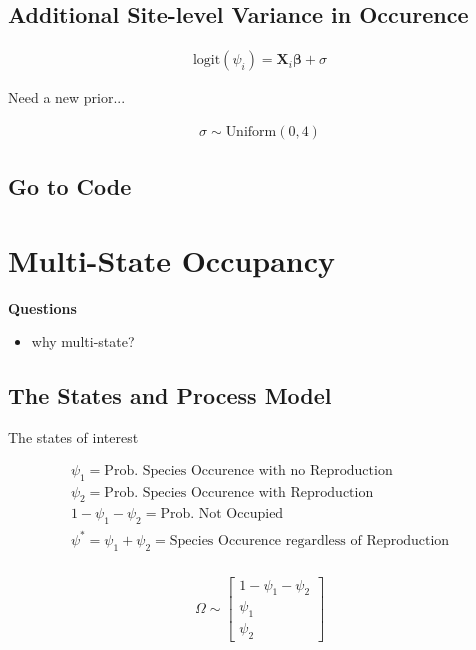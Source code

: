 \documentclass[12pt]{article}
\begin{document}
\subsection{Additional Site-level Variance in Occurence}

\begin{align*}
\text{logit}(\psi_{i}) = \textbf{X}_{i}\boldsymbol{\beta}+ \sigma
\end{align*}

Need a new prior...

\begin{align*}
\sigma \sim \text{Uniform}(0, 4)
\end{align*}


\subsection{Go to Code}

\section{Multi-State Occupancy}

\textbf{Questions}
\begin{itemize}
	\item why multi-state?
\end{itemize}


\subsection{The States and Process Model}

The states of interest

\begin{align*}
\psi_1 = \text{Prob. Species Occurence with no Reproduction}\\
\psi_2 = \text{Prob. Species Occurence with Reproduction}\\
1 - \psi_1 - \psi_2 =  \text{Prob.  Not Occupied}\\
\psi^{*} =  \psi_1 + \psi_2 = \text{Species Occurence regardless of Reproduction}\\
\end{align*}


\begin{align*}
\Omega \sim
\begin{bmatrix}
           1- \psi_{1} - \psi_{2} \\
           \psi_1 \\
	 \psi_2
\end{bmatrix}
\end{align*}
\end{document}

